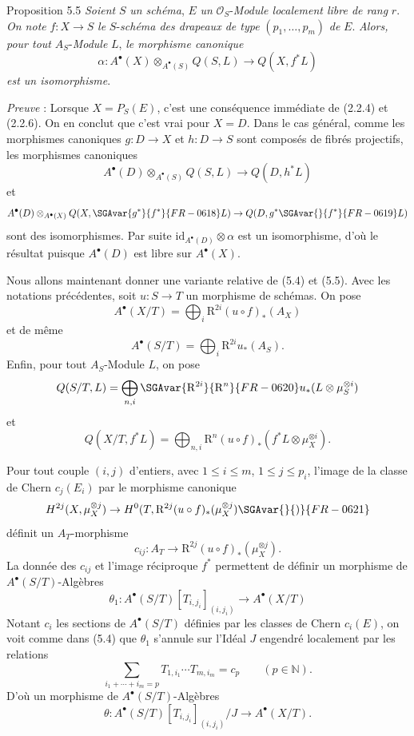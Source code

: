 \begin{statement}{Proposition 5.5}
\emph{Soient} $S$ \emph{un schéma}, $E$ \emph{un} $\mathcal{O}_S$-\emph{Module localement libre de rang} $r$. \emph{On note} $f:X\to S$ \emph{le} $S$-\emph{schéma des drapeaux de type} $(p_1,\ldots,p_m)$ \emph{de} $E$. \emph{Alors, pour tout} $A_S$-\emph{Module} $L$, \emph{le morphisme canonique}
\[
\alpha:A^\bullet(X)\otimes_{A^\bullet(S)}Q(S,L)\to Q(X,f^*L)
\]
\emph{est un isomorphisme}.
\end{statement}

\emph{Preuve} : Lorsque $X=P_S(E)$, c'est une conséquence immédiate de (2.2.4) et (2.2.6). On en conclut que c'est vrai pour $X=D$. Dans le cas général, comme les morphismes canoniques $g:D\to X$ et $h:D\to S$ sont composés de fibrés projectifs, les morphismes canoniques
\[
A^\bullet(D)\otimes_{A^\bullet(S)}Q(S,L)\to Q(D,h^*L)
\]
et
\[
A^\bullet(D)\otimes_{A^\bullet(X)}Q(X,\SGAvar{g^*}{f^*}{FR-0618}L)\to Q(D,g^*\SGAvar{}{f^*}{FR-0619}L)
\]
sont des isomorphismes. Par suite $\mathrm{id}_{A^\bullet(D)}\otimes\alpha$ est un isomorphisme, d'où le résultat puisque $A^\bullet(D)$ est libre sur $A^\bullet(X)$.

Nous allons maintenant donner une variante relative de (5.4) et (5.5). Avec les notations précédentes, soit $u:S\to T$ un morphisme de schémas. On pose
\[
A^\bullet(X/T)=\bigoplus_i \mathrm{R}^{2i}(u\circ f)_*(A_X)
\]
et de même
\[
A^\bullet(S/T)=\bigoplus_i \mathrm{R}^{2i}u_*(A_S).
\]
Enfin, pour tout $A_S$-Module $L$, on pose
\[
Q(S/T,L)=\bigoplus_{n,i}\SGAvar{\mathrm{R}^{2i}}{\mathrm{R}^n}{FR-0620} u_*(L\otimes\mu_S^{\otimes i})
\]
et
\[
Q(X/T,f^*L)=\bigoplus_{n,i}\mathrm{R}^n(u\circ f)_*(f^*L\otimes\mu_X^{\otimes i}).
\]

Pour tout couple $(i,j)$ d'entiers, avec $1\le i\le m$, $1\le j\le p_i$, l'image de la classe de Chern $c_j(E_i)$ par le morphisme canonique
\[
H^{2j}(X,\mu_X^{\otimes j})
\to H^0(T,\mathrm{R}^{2j}(u\circ f)_*(\mu_X^{\otimes j})\SGAvar{}{)}{FR-0621}
\]
définit un $A_T$-morphisme
\[
c_{ij}:A_T\to \mathrm{R}^{2j}(u\circ f)_*(\mu_X^{\otimes j}).
\]
La donnée des $c_{ij}$ et l'image réciproque $f^*$ permettent de définir un morphisme de $A^\bullet(S/T)$-Algèbres
\[
\theta_1:A^\bullet(S/T)[T_{i,j_i}]_{(i,j_i)}\to A^\bullet(X/T)
\]
Notant $c_i$ les sections de $A^\bullet(S/T)$ définies par les classes de Chern $c_i(E)$, on voit comme dans (5.4) que $\theta_1$ s'annule sur l'Idéal $J$ engendré localement par les relations
\[
\sum_{i_1+\cdots+i_m=p}T_{1,i_1}\cdots T_{m,i_m}=c_p\qquad(p\in\mathbb{N}).
\]
D'où un morphisme de $A^\bullet(S/T)$-Algèbres
\[
\theta:A^\bullet(S/T)[T_{i,j_i}]_{(i,j_i)}/J\to A^\bullet(X/T).
\]

